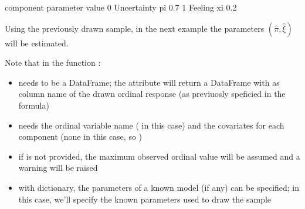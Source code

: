 \documentclass[letterpaper,10pt,english]{sphinxmanual}
\begin{document}
\begin{sphinxVerbatim}[commandchars=\\\{\}]
     component parameter  value
0  Uncertainty        pi    0.7
1      Feeling        xi    0.2
\end{sphinxVerbatim}

\sphinxAtStartPar
Using the previously drawn sample, in the next example the parameters \((\hat\pi, \hat\xi)\) will be estimated.

\sphinxAtStartPar
Note that in the function :
\begin{itemize}
\item {} 
\sphinxAtStartPar
{} needs to be a  DataFrame; the attribute  will return a DataFrame with  as column name of the drawn ordinal response (as previuosly speficied in the formula)

\item {} 
\sphinxAtStartPar
{} needs the ordinal variable name ( in this case) and the covariates for each component (none in this case, so )

\item {} 
\sphinxAtStartPar
if  is not provided, the maximum observed ordinal value will be assumed and a warning will be raised

\item {} 
\sphinxAtStartPar
with  dictionary, the parameters of a known model (if any) can be specified; in this case, we’ll specify the known parameters used to draw the sample

\end{itemize}
\def\sphinxLiteralBlockLabel{\label{\detokenize{manual:id43}}}
\begin{sphinxVerbatim}[commandchars=\\\{\},numbers=left,firstnumber=1,stepnumber=1]
  
         \PYG{p}{[}\PYG{p}{]}
         \PYG{p}{[}\PYG{p}{]}
\end{sphinxVerbatim}
\end{document}

